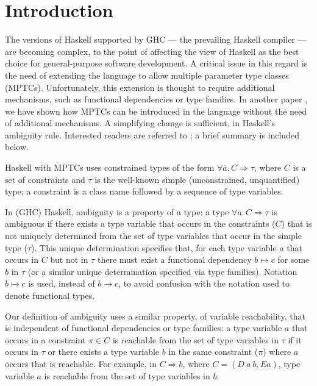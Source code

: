 \section{Introduction}
\label{sec:intro}

The versions of Haskell supported by GHC --- the prevailing Haskell
compiler --- are becoming complex, to the point of affecting the view
of Haskell as the best choice for general-purpose software
development. A critical issue in this regard is the need of extending
the language to allow multiple parameter type classes
(MPTCs). Unfortunately, this extension is thought to require
additional mechanisms, such as functional dependencies or type
families. In another paper
\cite{JBCS-Ambiguity-and-constrained-polymorphism}, we have shown how
MPTCs can be introduced in the language without the need of additional
mechanisms. A simplifying change is sufficient, in Haskell's ambiguity
rule. Interested readers are referred to
\cite{JBCS-Ambiguity-and-constrained-polymorphism}; a brief summary is
included below.

Haskell with MPTCs uses constrained types of the form $\forall
\overline{a}.\,C \Rightarrow \tau$, where $C$ is a set of constraints
and $\tau$ is the well-known simple (unconstrained, unquantified)
type; a constraint is a class name followed by a sequence of type
variables.

In (GHC) Haskell, ambiguity is a property of a type: a type $\forall
\overline{a}.\,C \Rightarrow \tau$ is ambiguous if there exists a type
variable that occurs in the constraints ($C$) that is not uniquely
determined from the set of type variables that occur in the simple
type ($\tau$). This unique determination specifies that, for each type
variable $a$ that occurs in $C$ but not in $\tau$ there must exist a
functional dependency $b \mapsto c$ for some $b$ in $\tau$ (or a
similar unique determination specified via type families). Notation $b
\mapsto c$ is used, instead of $b \rightarrow c$, to avoid confusion
with the notation used to denote functional types.

Our definition of ambiguity uses a similar property, of variable
reachability, that is independent of functional dependencies or type
families: a type variable $a$ that occurs in a constraint $\pi \in C$
is reachable from the set of type variables in $\tau$ if it occurs in
$\tau$ or there exists a type variable $b$ in the same constraint
($\pi$) where $a$ occurs that is reachable. For example, in $C
\Rightarrow b$, where $C = (D\: a\: b, E a)$, type variable $a$ is
reachable from the set of type variables in $b$.

